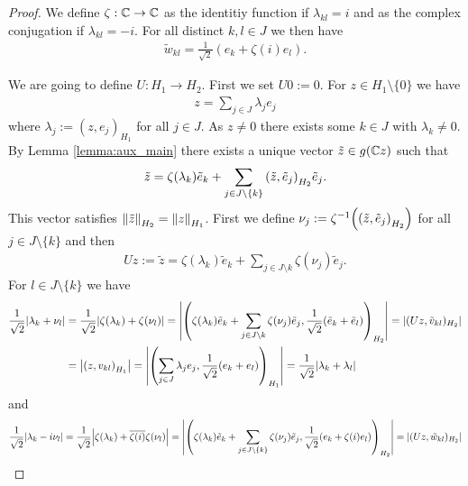 \begin{proof}
	We define $\zeta: \C \to \C$ as the identitiy function if $\lambda_{kl} = i$ and as the complex conjugation if $\lambda_{kl} = -i$. For all distinct $k,l \in J$ we then have 
	\begin{align*}
		\tilde{w}_{kl} = \frac{1}{\sqrt{2}}(e_k + \zeta(i) e_l).
	\end{align*}
	
	We are going to define $U: H_1 \to H_2$. First we set $U0 := 0$. For $z \in H_1 \setminus \{0\}$ we have
	\begin{align*}
		z = \sum_{j \in J} \lambda_j e_j
	\end{align*}
	where $\lambda_j := (z,e_j)_{H_1}$ for all $j \in J$. As $z \neq 0$ there exists some $k \in J$ with $\lambda_k \neq 0$. By Lemma \ref{lemma:aux_main} there exists a unique vector $\tilde{z} \in g(\C z)$ such that
	\begin{align*}
		\tilde{z} = \zeta\pbraces{\lambda_k} \tilde{e}_k + \sum_{j \in J \setminus \{k\}} \pbraces{\tilde{z}, \tilde{e}_j}_{H_2} \tilde{e}_j.
	\end{align*} 
	This vector satisfies $\norm[H_2]{\tilde{z}} = \norm[H_1]{z}$. First we define $\nu_j := \zeta^{-1}\pbraces{\pbraces{\tilde{z}, \tilde{e}_j}_{H_2}}$ for all $j \in J \setminus \{k\}$ and then 
	\begin{align*}
		Uz := \tilde{z} = \zeta(\lambda_k) \tilde{e}_k + \sum_{j \in J \setminus{k}} \zeta(\nu_j) \tilde{e}_j.
	\end{align*}
	For $l \in J \setminus \{k\}$ we have
	\begin{align*}
		\frac{1}{\sqrt{2}}\vbraces{\lambda_k + \nu_l} &= \frac{1}{\sqrt{2}} \vbraces{\zeta(\lambda_k) + \zeta(\nu_l)} = \vbraces{\pbraces{\zeta(\lambda_k) \tilde{e}_k + \sum_{j \in J \setminus{k}} \zeta(\nu_j) \tilde{e}_j, \frac{1}{\sqrt{2}}(\tilde{e}_k + \tilde{e}_l)}_{H_2}} = |(Uz, \tilde{v}_{kl})_{H_2}| \\
		&= \vbraces{\pbraces{z, v_{kl}}_{H_1}} = \vbraces{\pbraces{\sum_{j \in J} \lambda_j e_j, \frac{1}{\sqrt{2}}(e_k + e_l)}_{H_1}} = \frac{1}{\sqrt{2}} \vbraces{\lambda_k + \lambda_l} 
	\end{align*}
	and 
	\begin{align*}
		\frac{1}{\sqrt{2}}\vbraces{\lambda_k - i \nu_l} &= \frac{1}{\sqrt{2}} \vbraces{\zeta(\lambda_k) + \overline{\zeta(i)} \zeta(\nu_l)} = \vbraces{\pbraces{\zeta(\lambda_k) \tilde{e}_k + \sum_{j \in J \setminus \{k\}} \zeta(\nu_j) \tilde{e}_j, \frac{1}{\sqrt{2}}\pbraces{e_k + \zeta(i) e_l}}_{H_2}} = |(Uz, \tilde{w}_{kl})_{H_2}| \\

\end{align*}
\end{proof}
